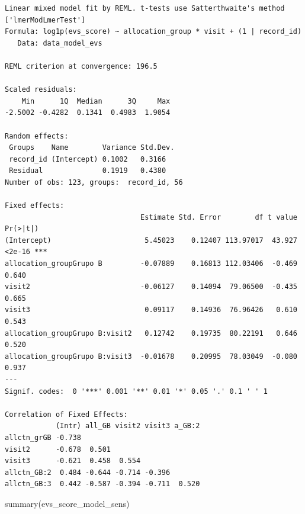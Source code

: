 \documentclass[
  12pt,
]{article}
\newenvironment{Shaded}{\begin{snugshade}}{\end{snugshade}}
\newcommand{\FunctionTok}[1]{\textcolor[rgb]{0.28,0.35,0.67}{#1}}
\newcommand{\NormalTok}[1]{\textcolor[rgb]{0.00,0.23,0.31}{#1}}
\begin{document}
\begin{verbatim}
Linear mixed model fit by REML. t-tests use Satterthwaite's method ['lmerModLmerTest']
Formula: log1p(evs_score) ~ allocation_group * visit + (1 | record_id)
   Data: data_model_evs

REML criterion at convergence: 196.5

Scaled residuals: 
    Min      1Q  Median      3Q     Max 
-2.5002 -0.4282  0.1341  0.4983  1.9054 

Random effects:
 Groups    Name        Variance Std.Dev.
 record_id (Intercept) 0.1002   0.3166  
 Residual              0.1919   0.4380  
Number of obs: 123, groups:  record_id, 56

Fixed effects:
                                Estimate Std. Error        df t value Pr(>|t|)    
(Intercept)                      5.45023    0.12407 113.97017  43.927   <2e-16 ***
allocation_groupGrupo B         -0.07889    0.16813 112.03406  -0.469    0.640    
visit2                          -0.06127    0.14094  79.06500  -0.435    0.665    
visit3                           0.09117    0.14936  76.96426   0.610    0.543    
allocation_groupGrupo B:visit2   0.12742    0.19735  80.22191   0.646    0.520    
allocation_groupGrupo B:visit3  -0.01678    0.20995  78.03049  -0.080    0.937    
---
Signif. codes:  0 '***' 0.001 '**' 0.01 '*' 0.05 '.' 0.1 ' ' 1

Correlation of Fixed Effects:
            (Intr) all_GB visit2 visit3 a_GB:2
allctn_grGB -0.738                            
visit2      -0.678  0.501                     
visit3      -0.621  0.458  0.554              
allctn_GB:2  0.484 -0.644 -0.714 -0.396       
allctn_GB:3  0.442 -0.587 -0.394 -0.711  0.520
\end{verbatim}

\begin{Shaded}
\begin{Highlighting}[]
\FunctionTok{summary}\NormalTok{(evs\_score\_model\_sens)}
\end{Highlighting}
\end{Shaded}
\end{document}
